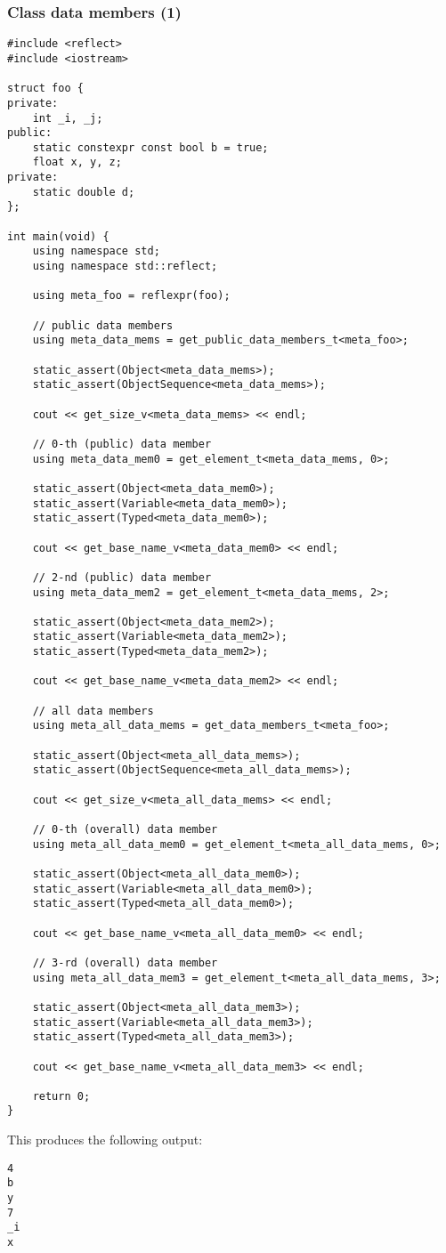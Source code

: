 \subsubsection{Class data members (1)}

\begin{verbatim}
#include <reflect>
#include <iostream>

struct foo {
private:
	int _i, _j;
public:
	static constexpr const bool b = true;
	float x, y, z;
private:
	static double d;
};

int main(void) {
	using namespace std;
	using namespace std::reflect;

	using meta_foo = reflexpr(foo);

	// public data members
	using meta_data_mems = get_public_data_members_t<meta_foo>;

	static_assert(Object<meta_data_mems>);
	static_assert(ObjectSequence<meta_data_mems>);

	cout << get_size_v<meta_data_mems> << endl;

	// 0-th (public) data member
	using meta_data_mem0 = get_element_t<meta_data_mems, 0>;

	static_assert(Object<meta_data_mem0>);
	static_assert(Variable<meta_data_mem0>);
	static_assert(Typed<meta_data_mem0>);

	cout << get_base_name_v<meta_data_mem0> << endl;

	// 2-nd (public) data member
	using meta_data_mem2 = get_element_t<meta_data_mems, 2>;

	static_assert(Object<meta_data_mem2>);
	static_assert(Variable<meta_data_mem2>);
	static_assert(Typed<meta_data_mem2>);

	cout << get_base_name_v<meta_data_mem2> << endl;

	// all data members
	using meta_all_data_mems = get_data_members_t<meta_foo>;

	static_assert(Object<meta_all_data_mems>);
	static_assert(ObjectSequence<meta_all_data_mems>);

	cout << get_size_v<meta_all_data_mems> << endl;

	// 0-th (overall) data member
	using meta_all_data_mem0 = get_element_t<meta_all_data_mems, 0>;

	static_assert(Object<meta_all_data_mem0>);
	static_assert(Variable<meta_all_data_mem0>);
	static_assert(Typed<meta_all_data_mem0>);

	cout << get_base_name_v<meta_all_data_mem0> << endl;

	// 3-rd (overall) data member
	using meta_all_data_mem3 = get_element_t<meta_all_data_mems, 3>;

	static_assert(Object<meta_all_data_mem3>);
	static_assert(Variable<meta_all_data_mem3>);
	static_assert(Typed<meta_all_data_mem3>);

	cout << get_base_name_v<meta_all_data_mem3> << endl;

	return 0;
}

\end{verbatim}

This produces the following output:

\begin{verbatim}
4
b
y
7
_i
x
\end{verbatim}
